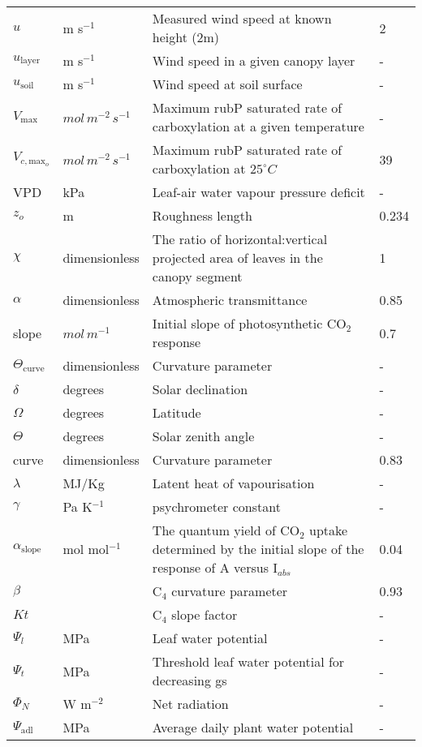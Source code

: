 \documentclass[12pt]{report}
\begin{document}
\begin{center}
\begin{longtable}{l l p{3in} p{0.5in}}
$u$	&	m s$^{-1}$	&	Measured wind speed at known height (2m)	&	2	\\
$u_{\text{layer}}$	&	m s$^{-1}$ 	&	Wind speed in a given canopy layer	&	-	\\
$u_{\text{soil}}$	&	m s$^{-1}$ 	&	Wind speed at soil surface	&	-	\\
$V_{\text{max}}$	&	$mol\, m^{-2}\, s^{-1}$ 	&	Maximum rubP saturated rate of carboxylation at a given temperature	&	-	\\
$V_{c,\text{max}_o}$	&	$mol\, m^{-2}\, s^{-1}$ 	&	Maximum rubP saturated rate of carboxylation at $25^\circ C$	&	39	\\
VPD	&	kPa	&	Leaf-air water vapour pressure deficit	&	-	\\
$z_o$	&	m	&	Roughness length	&	0.234	\\
$\chi$	&	dimensionless	&	The ratio of horizontal:vertical projected area of leaves in the canopy segment	&	1	\\
$\alpha$	&	dimensionless	&	Atmospheric transmittance	&	0.85	\\
slope	&	$mol\, m^{-1}$ 	&	Initial slope of photosynthetic CO$_2$ response	&	0.7	\\
$\Theta_{\text{curve}}$	&	dimensionless	&	Curvature parameter	&	-	\\
$\delta$	&	degrees	&	Solar declination	&	-	\\
$\Omega$	&	degrees	&	Latitude	&	-	\\
$\Theta$	&	degrees	&	Solar zenith angle	&	-	\\
curve	&	dimensionless	&	Curvature parameter	&	0.83	\\
$\lambda$	&	MJ/Kg	&	Latent heat of vapourisation	&	-	\\
$\gamma$	&	Pa K$^{-1}$	&	psychrometer constant 	&	-	\\
$\alpha_{\text{slope}}$	&	mol mol$^{-1}$ 	&	The quantum yield of CO$_2$ uptake determined by the initial slope of the response of A versus I$_{abs}$	&	0.04	\\
$\beta$	&		&	C$_4$ curvature parameter	&	0.93	\\
$Kt$	&		&	C$_4$ slope factor	&	-	\\
$\Psi_l$	&	MPa	&	Leaf water potential	&	-	\\
$\Psi_t$	&	MPa	&	Threshold leaf water potential for decreasing gs	&	-	\\
$\Phi_N$	&	W m$^{-2}$	&	Net radiation	&	-	\\
$\Psi_{\text{adl}}$	&	MPa	&	Average daily plant water potential	&	-	\\

\end{longtable}
\end{center}
\end{document}
